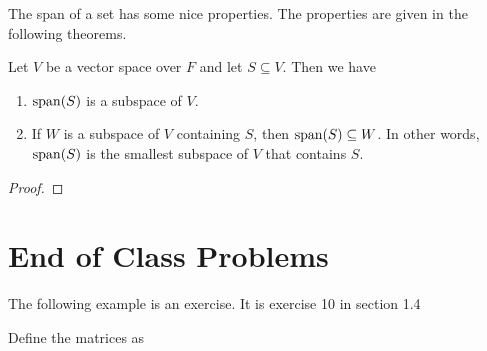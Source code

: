 \documentclass[main.tex]{subfiles}
\begin{document}
    The span of a set has some nice properties. The properties are given in the following theorems. 
    \begin{thrm}{}{}
        Let $V$ be a vector space over $F$ and let $S \subseteq V$. Then we have 
        \begin{enumerate}
            \item $\operatorname{span}(S)$ is a subspace of $V$.
            \item If $W$ is a subspace of $V$ containing $S$, then $\operatorname{span}(S) \subseteq W$. In other words, $\operatorname{span}(S)$ is the smallest subspace of $V$ that contains $S$.
        \end{enumerate}
    \end{thrm}
    \begin{proof}
        
    \end{proof}

    \section{End of Class Problems}
    The following example is an exercise. It is exercise 10 in section 1.4
    \begin{example}{}{}
        Define the matrices as 
    \end{example}
\end{document}
